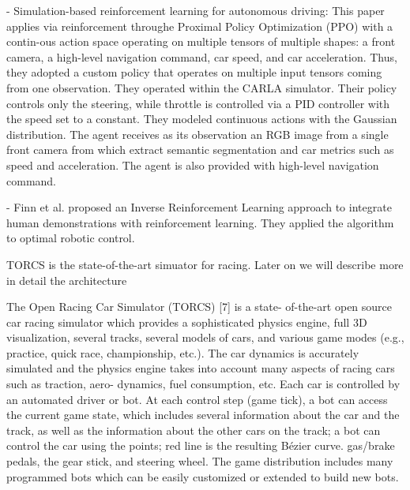 - Simulation-based reinforcement learning for autonomous driving:
This paper applies via reinforcement throughe Proximal Policy Optimization (PPO) with a contin-ous action space operating on multiple tensors of multiple shapes: a front camera, a high-level navigation command, car speed, and car acceleration. Thus, they adopted a custom policy that operates on multiple input tensors coming from one observation. They operated within the CARLA simulator. Their policy controls only the steering, while throttle is controlled via a PID controller with the speed set to a constant.
They modeled continuous actions with the Gaussian distribution.
The agent receives as its observation an RGB image from a single front camera from which extract semantic segmentation and car metrics such as speed and acceleration. The agent is also provided with high-level navigation command. 



- Finn et al. proposed an Inverse Reinforcement Learning \cite{inverse} approach to integrate human demonstrations with reinforcement learning. They applied the algorithm to optimal robotic control.




TORCS is the state-of-the-art simuator for racing. Later on we will describe more in detail the architecture



The Open Racing Car Simulator (TORCS) [7] is a state-
of-the-art open source car racing simulator which provides
a sophisticated physics engine, full 3D visualization, several
tracks, several models of cars, and various game modes (e.g.,
practice, quick race, championship, etc.). The car dynamics
is accurately simulated and the physics engine takes into
account many aspects of racing cars such as traction, aero-
dynamics, fuel consumption, etc.
Each car is controlled by an automated driver or bot. At
each control step (game tick), a bot can access the current
game state, which includes several information about the
car and the track, as well as the information about the
other cars on the track; a bot can control the car using the
points; red line is the resulting Bézier curve.
gas/brake pedals, the gear stick, and steering wheel. The
game distribution includes many programmed bots which can
be easily customized or extended to build new bots.